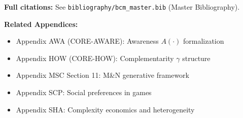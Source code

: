 \textbf{Full citations:} See \texttt{bibliography/bcm\_master.bib} (Master Bibliography).

\textbf{Related Appendices:}
\begin{itemize}[nosep]
    \item Appendix AWA (CORE-AWARE): Awareness $A(\cdot)$ formalization
    \item Appendix HOW (CORE-HOW): Complementarity $\gamma$ structure
    \item Appendix MSC Section 11: M\&N generative framework
    \item Appendix SCP: Social preferences in games
    \item Appendix SHA: Complexity economics and heterogeneity
\end{itemize}

